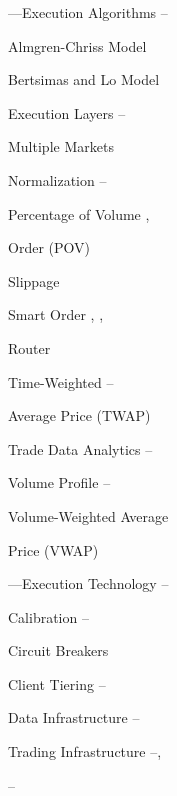 \begin{multicols}{2}
\noindent ---Execution Algorithms \hfill \pageref{in:exec_alg1}--\pageref{in:exec_alg2} \par
\twoindent Almgren-Chriss Model \hfill \pageref{in:alm_chriss} \par
\twoindent Bertsimas and Lo Model \hfill \pageref{in:bert_lo} \par
\twoindent Execution Layers \hfill \pageref{in:exec_layer1}--\pageref{in:exec_layer2} \par
\twoindent Multiple Markets \hfill  \pageref{in:mult_mark} \par 
\twoindent Normalization \hfill \pageref{in:normalization1}--\pageref{in:normalization2} \par
\twoindent Percentage of Volume \hfill \pageref{in:pov1}, \pageref{in:pov2} \par \hspace{0.75cm} Order (POV) \par 
\twoindent Slippage \hfill \pageref{in:slippage} \par
\twoindent Smart Order \hfill \pageref{in:sor1}, \pageref{in:sor2}, \pageref{in:sor3} \par \hspace{0.75cm} Router \par
\twoindent Time-Weighted \hfill \pageref{in:twap1}--\pageref{in:twap2} \par
\hspace{0.75cm} Average Price (TWAP) \par
\twoindent Trade Data Analytics \hfill \pageref{in:tda1}--\pageref{in:tda2} \par
\twoindent Volume Profile \hfill \pageref{in:vol_prof1}--\pageref{in:vol_prof2} \par
\twoindent Volume-Weighted Average \hfill \pageref{in:vwap} \par \hspace{0.75cm} Price (VWAP)
\vspace{\baselineskip}


\noindent ---Execution Technology \hfill \pageref{in:exec_tech1}--\pageref{in:exec_tech2} \par
\twoindent Calibration \hfill \pageref{in:calb1}--\pageref{in:calb2} \par
\twoindent Circuit Breakers \hfill \pageref{in:circ_br} \par
\twoindent Client Tiering \hfill \pageref{in:client_t1}--\pageref{in:client_t2} \par
\twoindent Data Infrastructure \hfill \pageref{in:dat_infr1}--\pageref{in:dat_infr2} \par
\twoindent Trading Infrastructure \hfill \pageref{in:trad_infr1}--\pageref{in:trad_infr2}, \par \hfill \pageref{in:trad_infr3}--\pageref{in:trad_infr4}\, \par
\vspace{\baselineskip}



\end{multicols}
